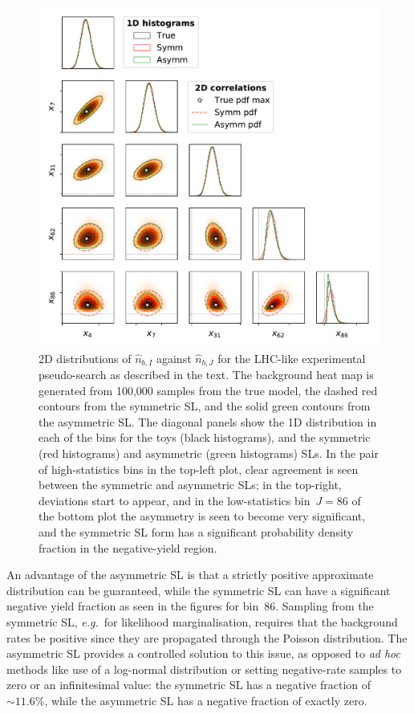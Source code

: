 \documentclass[11pt]{article}
\def\eg{{\it e.g.}}
\begin{document}
\begin{figure}[t]  \centering
  \includegraphics[width=\textwidth]{figures/plotmatrix}
  \caption{2D distributions of $\hat{n}_{b,I}$ against $\hat{n}_{b,J}$ for the LHC-like 
    experimental pseudo-search %
    as described in the text. The
    background heat map is generated from 100,000 samples from the true 
    model, the dashed red contours from the symmetric SL, and the solid
    green contours from the asymmetric SL. The diagonal panels show the
    1D distribution in each of the bins for the toys (black histograms), and the
    symmetric (red histograms) and asymmetric (green histograms) SLs.
    In the pair of
    high-statistics bins in the top-left plot, clear agreement is seen between
    the symmetric and asymmetric  SLs; in the top-right, deviations start to
    appear, and in the low-statistics bin~$J=86$ of the bottom plot the
    asymmetry is seen to become very significant, and the symmetric  SL form has a
    significant probability density fraction in the negative-yield region.}
  \label{fig:distributions2d}
\end{figure}


An advantage of the asymmetric SL is that a strictly positive
approximate distribution can be guaranteed, while the symmetric SL can have a
significant negative yield fraction as seen in the figures for bin~86. Sampling
from the symmetric SL, \eg\ for likelihood marginalisation, requires that the
background rates be positive since they are propagated through the Poisson
distribution. The asymmetric SL provides a controlled solution to this issue,
as opposed to \emph{ad hoc} methods like use of a log-normal distribution or
setting negative-rate samples to zero or an infinitesimal value: the symmetric SL has a negative fraction of $\sim\!11.6\%$, while the
asymmetric SL has a negative fraction of exactly zero.
\end{document}
